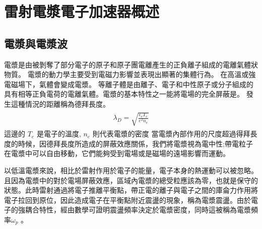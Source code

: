 \chapter{雷射電漿電子加速器概述}



\section{電漿與電漿波}

電漿是由被剝奪了部分電子的原子和原子團電離產生的正負離子組成的電離氣體狀物質。
電漿的動力學主要受到電磁力影響並表現出顯著的集體行為。
在高溫或強電磁場下，氣體會變成電漿。
等離子體是由離子、電子和中性原子或分子組成的具有相等正負電荷的電離氣體。電漿的基本特性之一能將電場的完全屏蔽是。
發生這種情況的距離稱為德拜長度\cite{Buck2011}。
\begin{align}
  \begin{split}
    \lambda_{D} = \sqrt{\frac{\epsilon_e T_e}{e^{2} n_e}}
  \end{split}
\end{align}
 這邊的  \(T_{e}\) 是電子的溫度,  \(n_{e}\) 則代表電漿的密度
當電漿內部作用的尺度超過得拜長度的時候，因德拜長度所造成的屏蔽效應關係，我們將電漿視為電中性;帶電粒子在電漿中可以自由移動，它們能夠受到電場或是磁場的遠場影響而運動。

以低溫電漿來說，相比於雷射作用於電子的能量，電子本身的熱運動可以被忽略。且因為電漿中的對於電場屏蔽效應，區域內電漿的總受粒應該為零，也就是保守的狀態。此時雷射通過將電子推離平衡點，帶正電的離子與電子之間的庫侖力作用將電子拉回到原位，因此造成電子在平衡點附近震盪的現象，稱為電漿震盪。由於電子的強耦合特性，經由數學可證明震盪頻率決定於電漿密度，同時這被稱為電漿頻率\(\omega_{p}\) \cite{Koschitzki:2017qlg}。

